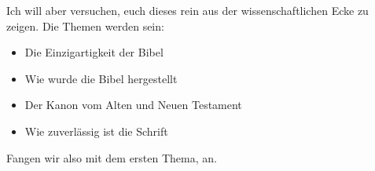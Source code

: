 Ich will aber versuchen, euch dieses rein aus der wissenschaftlichen Ecke zu zeigen. Die Themen werden sein:
\begin{itemize}
    \item Die Einzigartigkeit der Bibel
    \item Wie wurde die Bibel hergestellt
    \item Der Kanon vom Alten und Neuen Testament
    \item Wie zuverlässig ist die Schrift
\end{itemize}

Fangen wir also mit dem ersten Thema,  an.
